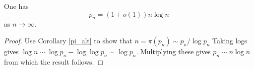 \begin{proposition}[pn-asymptotic]
\label{pn_asymptotic}
\leanok
One has
    $$ p_n = (1+o(1)) n \log n$$
  as $n \to \infty$.
\end{proposition}
\begin{proof}
\leanok
Use Corollary \ref{pi_alt} to show that $n=\pi(p_n)\sim p_n/\log p_n$
    Taking logs gives $\log n \sim \log p_n - \log\log p_n \sim \log p_n$.
    Multiplying these gives $p_n\sim n\log n$ from which the result follows.
\end{proof}
